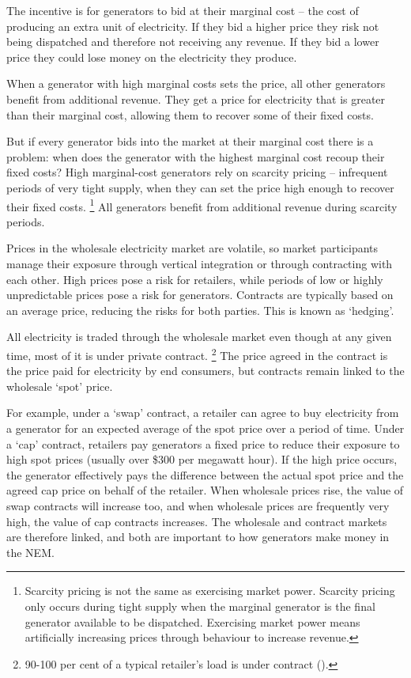 \documentclass[FrontPage]{grattan}
\begin{document}
The incentive is for generators to bid at their marginal cost -- the cost of producing an extra unit of electricity. If they bid a higher price they risk not being dispatched and therefore not receiving any revenue. If they bid a lower price they could lose money on the electricity they produce.

When a generator with high marginal costs sets the price, all other generators benefit from additional revenue. They get a price for electricity that is greater than their marginal cost, allowing them to recover some of their fixed costs.

But if every generator bids into the market at their marginal cost there is a problem: when does the generator with the highest marginal cost recoup their fixed costs? High marginal-cost generators rely on scarcity pricing -- infrequent periods of very tight supply, when they can set the price high enough to recover their fixed costs.%
\footnote{Scarcity pricing is not the same as exercising market power. Scarcity pricing only occurs during tight supply when the marginal generator is the final generator available to be dispatched. Exercising market power means artificially increasing prices through behaviour to increase revenue.}
All generators benefit from additional revenue during scarcity periods.

Prices in the wholesale electricity market are volatile, so market participants manage their exposure through vertical integration or through contracting with each other. High prices pose a risk for retailers, while periods of low or highly unpredictable prices pose a risk for generators. Contracts are typically based on an average price, reducing the risks for both parties. This is known as `hedging'.

All electricity is traded through the wholesale market even though at any given time, most of it is under private contract.%
\footnote{90-100 per cent of a typical retailer's load is under contract (\textcite{MEI2016ContractPosition}).}
The price agreed in the contract is the price paid for electricity by end consumers, but contracts remain linked to the wholesale `spot' price.

For example, under a `swap' contract, a retailer can agree to buy electricity from a generator for an expected average of the spot price over a period of time. Under a `cap' contract, retailers pay generators a fixed price to reduce their exposure to high spot prices (usually over \$300 per megawatt hour). If the high price occurs, the generator effectively pays the difference between the actual spot price and the agreed cap price on behalf of the retailer. When wholesale prices rise, the value of swap contracts will increase too, and when wholesale prices are frequently very high, the value of cap contracts increases. The wholesale and contract markets are therefore linked, and both are important to how generators make money in the NEM\@.
\end{document}
